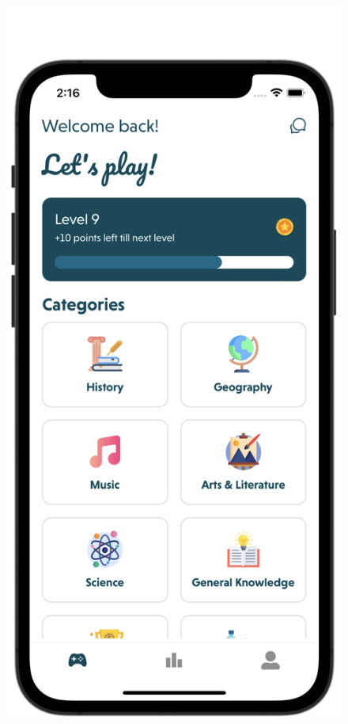 \begin{figure}[H]
    \centering
    \begin{minipage}[b]{0.43\linewidth}
        \centering
        \includegraphics[width=\linewidth]{Mobile UI/Quiz Page 1.png}

\end{minipage}
\end{figure}
